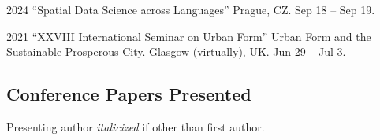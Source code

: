 \documentclass[12pt,a4paper]{report}
\begin{document}
    \begin{tablist}

        \item[2024] \tab{}\enquote{Spatial Data Science across Languages} Prague, CZ. Sep 18 -- Sep 19.
        \item[2021] \tab{}\enquote{XXVIII International Seminar on Urban Form} Urban Form and the Sustainable Prosperous City. Glasgow (virtually), UK. Jun 29 -- Jul 3.

    \end{tablist}

    \subsection*{Conference Papers Presented}

    Presenting author \textit{italicized} if other than first author.\bigskip
\end{document}
